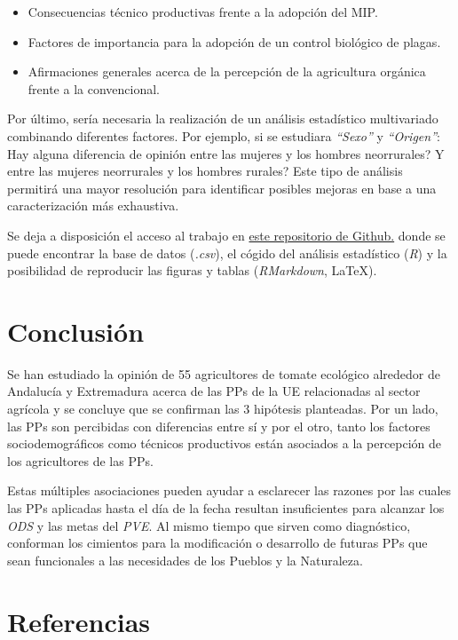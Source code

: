 \documentclass[a4paper, nobind]{templates/ociamthesis}
\providecommand{\tightlist}{%
  \setlength{\itemsep}{0pt}\setlength{\parskip}{0pt}}
\begin{document}
\begin{itemize}
\tightlist
\item
  Consecuencias técnico productivas frente a la adopción del MIP.
\item
  Factores de importancia para la adopción de un control biológico de plagas.
\item
  Afirmaciones generales acerca de la percepción de la agricultura orgánica frente a la convencional.
\end{itemize}

Por último, sería necesaria la realización de un análisis estadístico multivariado combinando diferentes factores. Por ejemplo, si se estudiara \emph{``Sexo''} y \emph{``Origen''}: \textquestiondown Hay alguna diferencia de opinión entre las mujeres y los hombres neorrurales? \textquestiondown Y entre las mujeres neorrurales y los hombres rurales? Este tipo de análisis permitirá una mayor resolución para identificar posibles mejoras en base a una caracterización más exhaustiva.

Se deja a disposición el acceso al trabajo en \href{https://github.com/ipastore/TFM_AGE_UPO_IPB.git}{este repositorio de Github.} donde se puede encontrar la base de datos (\emph{.csv}), el cógido del análisis estadístico (\emph{R}) y la posibilidad de reproducir las figuras y tablas (\emph{RMarkdown}, \LaTeX).

\hypertarget{conclusion}{%
\chapter{Conclusión}\label{conclusion}}

Se han estudiado la opinión de 55 agricultores de tomate ecológico alrededor de Andalucía y Extremadura acerca de las PPs de la UE relacionadas al sector agrícola y se concluye que se confirman las 3 hipótesis planteadas. Por un lado, las PPs son percibidas con diferencias entre sí y por el otro, tanto los factores sociodemográficos como técnicos productivos están asociados a la percepción de los agricultores de las PPs.

Estas múltiples asociaciones pueden ayudar a esclarecer las razones por las cuales las PPs aplicadas hasta el día de la fecha resultan insuficientes para alcanzar los \emph{ODS} y las metas del \emph{PVE}. Al mismo tiempo que sirven como diagnóstico, conforman los cimientos para la modificación o desarrollo de futuras PPs que sean funcionales a las necesidades de los Pueblos y la Naturaleza.

\hypertarget{referencias}{%
\chapter*{Referencias}\label{referencias}}
\end{document}
